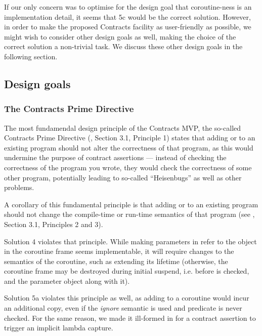 If our only concern was to optimise for the design goal that coroutine-ness is an implementation detail, it seems that 5c would be the correct solution. However, in order to make the proposed Contracts facility as user-friendly as possible, we might wish to consider other design goals as well, making the choice of the correct solution a non-trivial task. We discuss these other design goals in the following section.

\subsection{Design goals}

\subsubsection{The Contracts Prime Directive}

The most fundamendal design principle of the Contracts MVP, the so-called Contracts Prime Directive (\cite{P2900R8}, Section 3.1, Principle 1) states that adding  or  to an existing program should not alter the correctness of that program, as this would undermine the purpose of contract assertions --- instead of checking the correctness of the program you wrote, they would check the correctness of some other program, potentially leading to so-called ``Heisenbugs'' as well as other problems.

A corollary of this fundamental principle is that adding  or  to an existing program should not change the compile-time or run-time semantics of that program (see \cite{P2900R8}, Section 3.1, Principles 2 and 3).

Solution 4 violates that principle. While making parameters in  refer to the object in the coroutine frame seems implementable, it will require changes to the semantics of the coroutine, such as extending its lifetime (otherwise, the coroutine frame may be destroyed during initial suspend, i.e. before  is checked, and the parameter object along with it).

Solution 5a violates this principle as well, as adding  to a coroutine would incur an additional copy, even if the \emph{ignore} semantic is used and predicate is never checked. For the same reason, we made it ill-formed in \cite{P2900R8} for a contract assertion to trigger an implicit lambda capture.

